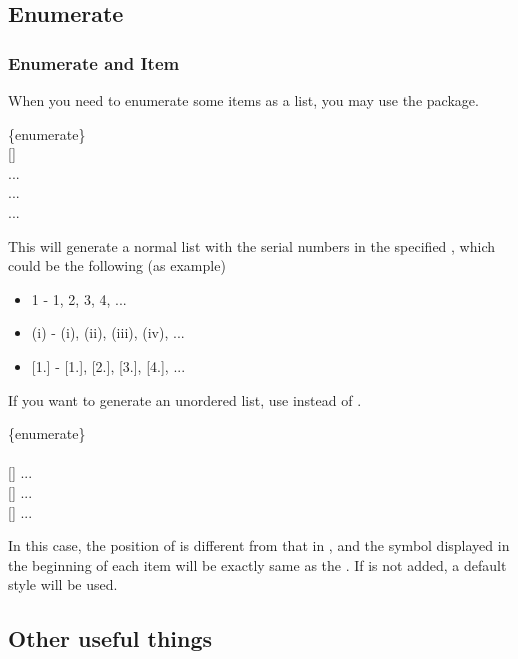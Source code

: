\subsection{Enumerate}
\begin{frame}
	\frametitle{Enumerate and Item}
	When you need to enumerate some items as a list, you may use the  package.
	\begin{command}
		\{enumerate\}\\
		[]\\
		\qquad{} ...\\
		\qquad{} ...\\
		\qquad{} ...\\
	\end{command}
	This will generate a normal list with the serial numbers in the specified , which could be the following (as example)
	\begin{itemize}
		\item \alert{1} - 1, 2, 3, 4, ...
		\item \alert{(i)} - (i), (ii), (iii), (iv), ...
		\item \alert{[1.]} - [1.], [2.], [3.], [4.], ...
	\end{itemize}
\end{frame}

\begin{frame}
	If you want to generate an unordered list, use  instead of \structure{enumerate}.
	\begin{command}
		\{enumerate\}\\
		\samplebegin{itemize}\\
		\qquad{}[] ...\\
		\qquad{}[] ...\\
		\qquad{}[] ...\\
		\sampleend{itemize}
	\end{command}
	In this case, the position of  is different from that in , and the symbol displayed in the beginning of each item will be exactly same as the . If  is not added, a default style will be used.
\end{frame}

\subsection{Other useful things}

